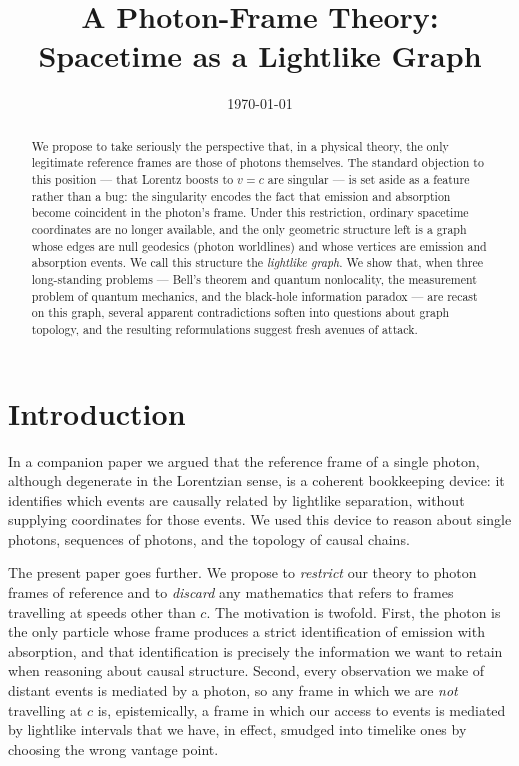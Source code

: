 \documentclass[11pt]{article}
\title{A Photon-Frame Theory:\\
Spacetime as a Lightlike Graph}
\date{\today}
\begin{document}
\maketitle

\begin{abstract}
We propose to take seriously the perspective that, in a physical theory, the only legitimate reference frames are those of photons themselves. The standard objection to this position --- that Lorentz boosts to $v = c$ are singular --- is set aside as a feature rather than a bug: the singularity encodes the fact that emission and absorption become coincident in the photon's frame. Under this restriction, ordinary spacetime coordinates are no longer available, and the only geometric structure left is a graph whose edges are null geodesics (photon worldlines) and whose vertices are emission and absorption events. We call this structure the \emph{lightlike graph}. We show that, when three long-standing problems --- Bell's theorem and quantum nonlocality, the measurement problem of quantum mechanics, and the black-hole information paradox --- are recast on this graph, several apparent contradictions soften into questions about graph topology, and the resulting reformulations suggest fresh avenues of attack.
\end{abstract}

\section{Introduction}

In a companion paper we argued that the reference frame of a single photon, although degenerate in the Lorentzian sense, is a coherent bookkeeping device: it identifies which events are causally related by lightlike separation, without supplying coordinates for those events. We used this device to reason about single photons, sequences of photons, and the topology of causal chains.

The present paper goes further. We propose to \emph{restrict} our theory to photon frames of reference and to \emph{discard} any mathematics that refers to frames travelling at speeds other than $c$. The motivation is twofold. First, the photon is the only particle whose frame produces a strict identification of emission with absorption, and that identification is precisely the information we want to retain when reasoning about causal structure. Second, every observation we make of distant events is mediated by a photon, so any frame in which we are \emph{not} travelling at $c$ is, epistemically, a frame in which our access to events is mediated by lightlike intervals that we have, in effect, smudged into timelike ones by choosing the wrong vantage point.
\end{document}
